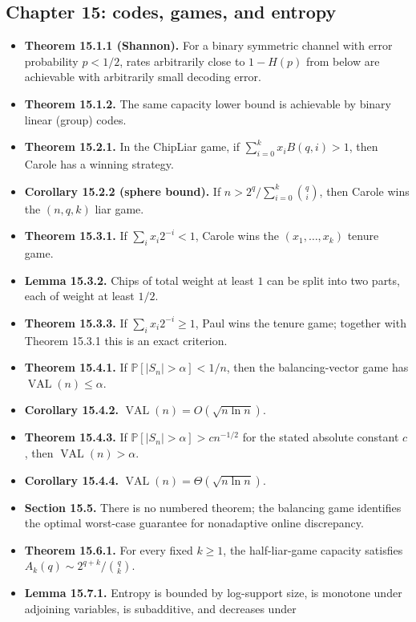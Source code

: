 \documentclass[10pt]{article}
\newcommand{\Prb}{\mathbb P}
\newcommand{\1}{\mathbf 1}
\begin{document}
\subsection*{Chapter 15: codes, games, and entropy}
\begin{itemize}
\item \textbf{Theorem 15.1.1 (Shannon).} For a binary symmetric channel with
error probability $p<1/2$, rates arbitrarily close to $1-H(p)$ from below are
achievable with arbitrarily small decoding error.
\item \textbf{Theorem 15.1.2.} The same capacity lower bound is achievable by
binary linear (group) codes.
\item \textbf{Theorem 15.2.1.} In the ChipLiar game, if
$\sum_{i=0}^k x_i B(q,i)>1$, then Carole has a winning strategy.
\item \textbf{Corollary 15.2.2 (sphere bound).} If
$n>2^q/\sum_{i=0}^k\binom qi$, then Carole wins the $(n,q,k)$ liar game.
\item \textbf{Theorem 15.3.1.} If $\sum_i x_i2^{-i}<1$, Carole wins the
$(x_1,\ldots,x_k)$ tenure game.
\item \textbf{Lemma 15.3.2.} Chips of total weight at least $1$ can be split
into two parts, each of weight at least $1/2$.
\item \textbf{Theorem 15.3.3.} If $\sum_i x_i2^{-i}\geq1$, Paul wins the
tenure game; together with Theorem 15.3.1 this is an exact criterion.
\item \textbf{Theorem 15.4.1.} If
$\Prb[|S_n|>\alpha]<1/n$, then the balancing-vector game has
$\operatorname{VAL}(n)\leq\alpha$.
\item \textbf{Corollary 15.4.2.}
$\operatorname{VAL}(n)=O(\sqrt{n\ln n})$.
\item \textbf{Theorem 15.4.3.} If
$\Prb[|S_n|>\alpha]>cn^{-1/2}$ for the stated absolute constant $c$, then
$\operatorname{VAL}(n)>\alpha$.
\item \textbf{Corollary 15.4.4.}
$\operatorname{VAL}(n)=\Theta(\sqrt{n\ln n})$.
\item \textbf{Section 15.5.} There is no numbered theorem; the balancing game
identifies the optimal worst-case guarantee for nonadaptive online discrepancy.
\item \textbf{Theorem 15.6.1.} For every fixed $k\geq1$, the half-liar-game
capacity satisfies $A_k(q)\sim2^{q+k}/\binom qk$.
\item \textbf{Lemma 15.7.1.} Entropy is bounded by log-support size, is
monotone under adjoining variables, is subadditive, and decreases under

\end{itemize}
\end{document}
